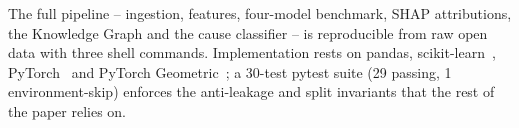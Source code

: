 The full pipeline -- ingestion, features, four-model benchmark, SHAP attributions, the Knowledge Graph and the cause classifier -- is reproducible from raw open data with three shell commands. Implementation rests on pandas, scikit-learn~\cite{pedregosa2011scikit}, PyTorch~\cite{paszke2019pytorch} and PyTorch Geometric~\cite{fey2019fast}; a 30-test pytest suite (29 passing, 1 environment-skip) enforces the anti-leakage and split invariants that the rest of the paper relies on.
